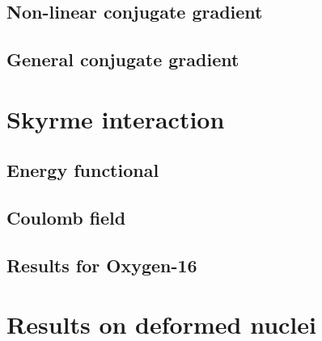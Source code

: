 \documentclass{book}
\begin{document}
\section{Non-linear conjugate gradient}
\section{General conjugate gradient}

\chapter{Skyrme interaction}
\section{Energy functional}
\section{Coulomb field}
\section{Results for Oxygen-16}

\chapter{Results on deformed nuclei}
\end{document}
